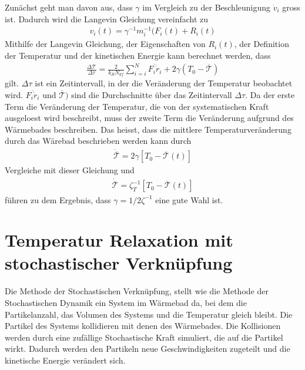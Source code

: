 \documentclass[]{article}
\begin{document}
Zunächst geht man davon aus, dass $\gamma$ im Vergleich zu der Beschleunigung $\dot{v}_i$ gross ist. Dadurch wird die Langevin Gleichung vereinfacht zu 
\begin{align*}
	v_i(t) = \gamma^{-1} m_i^{-1} (F_i(t) + R_i(t)
\end{align*}
Mithilfe der Langevin Gleichung, der Eigenschaften von $R_i(t)$, der Definition der Temperatur und der kinetischen Energie kann berechnet werden, dass 
\begin{align*}
	\frac{\Delta \mathcal{T}}{\Delta \tau} = \frac{2}{k_B N_{df}} \sum\limits_{i=i}^N \overline{F_i \dot{r}_i} + 2 \gamma (T_0 - \overline{\mathcal{T}})  
\end{align*} 
gilt. $\Delta \tau$ ist ein Zeitintervall, in der die Veränderung der Temperatur beobachtet wird. $\overline{F_i \dot{r}_i} $ und $\overline{\mathcal{T}})$ sind die Durchschnitte über das Zeitintervall $\Delta \tau$. Da der erste Term die Veränderung der Temperatur, die von der systematischen Kraft ausgeloest wird beschreibt, muss der zweite Term die Veränderung aufgrund des Wärmebades beschreiben. 
Das heisst, dass die mittlere Temperaturveränderung durch das Wärebad beschrieben werden kann durch
\begin{align*}
	\dot{ \overline{\mathcal{T}} } = 2 \gamma [T_0 - \overline{\mathcal{T}}(t)]  
\end{align*}
Vergleiche mit dieser Gleichung und 
\begin{align*}
 \dot{ \overline{\mathcal{T}} } = \zeta_T^{-1} [T_0 - \overline{\mathcal{T}}(t)] 
\end{align*}
führen zu dem Ergebnis, dass $\gamma = 1/2 \zeta^{-1}$ eine gute Wahl ist. 


\section{Temperatur Relaxation mit stochastischer Verknüpfung}

Die Methode der Stochastischen Verknüpfung, stellt wie die Methode der Stochastischen Dynamik ein System im Wärmebad da, bei dem die Partikelanzahl, das Volumen des Systems und die Temperatur gleich bleibt. Die Partikel des Systems kollidieren mit denen des Wärmebades. Die Kollisionen werden durch eine zufällige Stochastische Kraft simuliert, die auf die Partikel wirkt. Dadurch werden den Partikeln neue Geschwindigkeiten zugeteilt und die kinetische Energie verändert sich. 
\end{document}
